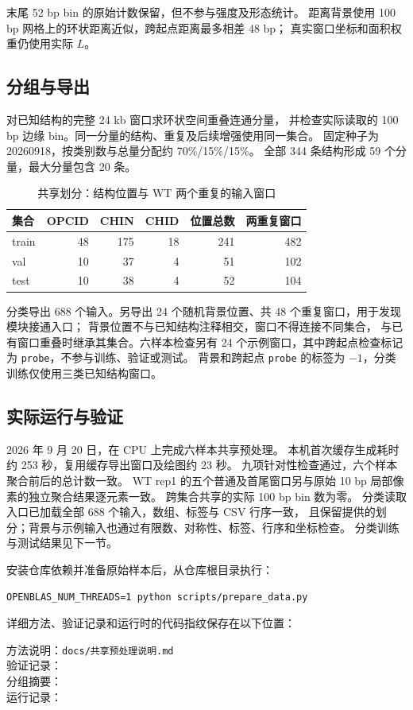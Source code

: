 末尾 52 bp bin 的原始计数保留，但不参与强度及形态统计。
距离背景使用 100 bp 网格上的环状距离近似，跨起点距离最多相差 48 bp；
真实窗口坐标和面积权重仍使用实际 $L$。

\subsection{分组与导出}
对已知结构的完整 24 kb 窗口求环状空间重叠连通分量，
并检查实际读取的 100 bp 边缘 bin。同一分量的结构、重复及后续增强使用同一集合。
固定种子为 20260918，按类别数与总量分配约 70\%/15\%/15\%。
全部 344 条结构形成 59 个分量，最大分量包含 20 条。

\begin{table}[htbp]
\centering
\caption{共享划分：结构位置与 WT 两个重复的输入窗口}
\begin{tabular}{l r r r r r}
\toprule
集合 & OPCID & CHIN & CHID & 位置总数 & 两重复窗口 \\
\midrule
train & 48 & 175 & 18 & 241 & 482 \\
val & 10 & 37 & 4 & 51 & 102 \\
test & 10 & 38 & 4 & 52 & 104 \\
\bottomrule
\end{tabular}
\end{table}

分类导出 688 个输入。另导出 24 个随机背景位置、共 48 个重复窗口，用于发现模块接通入口；
背景位置不与已知结构注释相交，窗口不得连接不同集合，
与已有窗口重叠时继承其集合。六样本检查另有 24 个示例窗口，其中跨起点检查标记为
\texttt{probe}，不参与训练、验证或测试。
背景和跨起点 \texttt{probe} 的标签为 $-1$，分类训练仅使用三类已知结构窗口。

\subsection{实际运行与验证}
2026 年 9 月 20 日，在 CPU 上完成六样本共享预处理。
本机首次缓存生成耗时约 253 秒，复用缓存导出窗口及绘图约 23 秒。
九项针对性检查通过，六个样本聚合前后的总计数一致。
WT rep1 的五个普通及首尾窗口另与原始 10 bp 局部像素的独立聚合结果逐元素一致。
跨集合共享的实际 100 bp bin 数为零。
分类读取入口已加载全部 688 个输入，数组、标签与 CSV 行序一致，
且保留提供的划分；背景与示例输入也通过有限数、对称性、标签、行序和坐标检查。
分类训练与测试结果见下一节。

安装仓库依赖并准备原始样本后，从仓库根目录执行：
\begin{verbatim}
OPENBLAS_NUM_THREADS=1 python scripts/prepare_data.py
\end{verbatim}
详细方法、验证记录和运行时的代码指纹保存在以下位置：
\begin{flushleft}
\small
方法说明：\texttt{docs/共享预处理说明.md}\\
验证记录：\\
分组摘要：\\
运行记录：
\end{flushleft}
